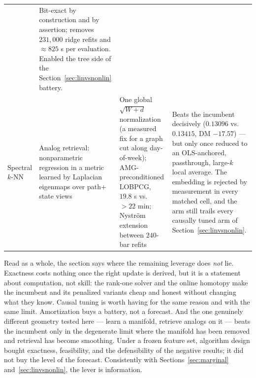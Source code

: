 \begin{table}[H]
\begin{tabular}{p{2.2cm} p{3.3cm} p{3.4cm} p{4.6cm}}
& Bit-exact by construction and by assertion; removes $231{,}000$ ridge refits and $\approx 825$ s per evaluation. Enabled the tree side of the Section~\ref{sec:linvsnonlin} battery. \\
\addlinespace
Spectral $k$-NN
& Analog retrieval: nonparametric regression in a metric learned by Laplacian eigenmaps over path$+$state views
& One global $\sqrt{W+d}$ normalization (a measured fix for a graph cut along day-of-week); AMG-preconditioned LOBPCG, $19.8$ s vs.\ $>22$ min; Nystr\"om extension between $240$-bar refits
& Beats the incumbent decisively ($0.13096$ vs.\ $0.13415$, DM $-17.57$) --- but only once reduced to an OLS-anchored, passthrough, large-$k$ local average. The embedding is rejected by measurement in every matched cell, and the arm still trails every causally tuned arm of Section~\ref{sec:linvsnonlin}. \\
\bottomrule
\end{tabular}
\end{table}

Read as a whole, the section says where the remaining leverage does \emph{not} lie.
Exactness costs nothing once the right update is derived, but it is a statement
about computation, not skill: the rank-one solver and the online homotopy make the
incumbent and its penalized variants cheap and honest without changing what they
know. Causal tuning is worth having for the same reason and with the same limit.
Amortization buys a battery, not a forecast. And the one genuinely different
geometry tested here --- learn a manifold, retrieve analogs on it --- beats the
incumbent only in the degenerate limit where the manifold has been removed and
retrieval has become smoothing. Under a frozen feature set, algorithm design bought
exactness, feasibility, and the defensibility of the negative results; it did not
buy the level of the forecast. Consistently with Sections~\ref{sec:marginal}
and~\ref{sec:linvsnonlin}, the lever is information.
